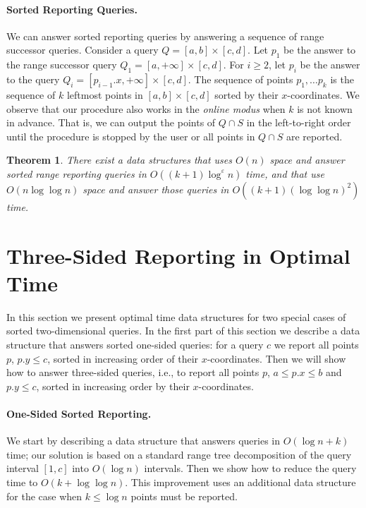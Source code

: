 \documentclass[11pt]{article}
\newcommand{\no}[1]{}
\newtheorem{theorem}{Theorem}
\newcommand{\eps}{\varepsilon}
\begin{document}
\paragraph{Sorted Reporting Queries.} 
We can answer sorted reporting queries by answering a sequence of 
range successor queries. Consider a query $Q=[a,b]\times [c,d]$. 
Let $p_1$ be the answer to the range successor query $Q_1=[a,+\infty]\times [c,d]$.
For $i\ge 2$, let $p_i$ be the answer to the query 
$Q_i=[p_{i-1}.x,+\infty]\times [c,d]$.  
The sequence of points $p_1,\ldots p_k$ is the sequence of $k$ leftmost 
points in $[a,b]\times [c,d]$ sorted by their $x$-coordinates. We observe 
that our procedure also works in the \emph{online modus} when  $k$ is not known in advance. That is, we can output the points of $Q\cap S$ in the left-to-right order until the procedure is stopped by the user or 
all points in $Q\cap S$ are reported.
\no{
 leftmost point,  then the next one, etc;   the query can be stopped at any time by 
the user. The total query time is the same as the time needed to answer 
$k$ range successor queries. } 
\begin{theorem}\label{theor:spaceeff}
There exist a data structures that uses $O(n)$ space and answer
  sorted range reporting queries in $O((k+1)\log^{\eps}n)$ time, and that
use $O(n\log \log n)$ space 
and answer those queries in $O((k+1)(\log \log n)^2)$ 
time.
\end{theorem}




\section{Three-Sided Reporting in Optimal Time}
\label{sec:3sided-rep}
In this section we present optimal time data structures for two special 
cases of sorted two-dimensional queries.
In the first part of this section we describe a data structure that
answers sorted one-sided queries: for a query $c$ we report all points
$p$, $p.y\le c$, sorted in increasing order of their $x$-coordinates. 
Then we will show how to answer three-sided queries, i.e., to report all points $p$, $a\le p.x\le b$ and
$p.y\le c$, sorted in increasing order by their $x$-coordinates. 



\paragraph{One-Sided Sorted Reporting.} We start by describing a data
structure that answers queries in $O(\log n+k)$ time; our solution is  based on a standard range tree
 decomposition of the query interval $[1,c]$ into $O(\log n)$ intervals. Then we show how
to reduce the query time to $O(k+\log \log n)$. This improvement uses an additional data structure 
for the case when $k\le \log n$ points must be reported. 
\end{document}
